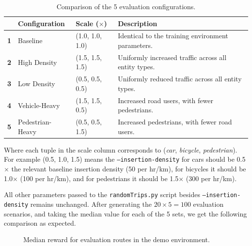 \documentclass[a4paper]{report}
\begin{document}
\begin{table}[H]
  \centering
  \begin{tabular}{c l l l}
    \hline
    & \textbf{Configuration} & \textbf{Scale ($\times$)} & \textbf{Description} \\
    \hline
    \textbf{1} & Baseline & (1.0, 1.0, 1.0) & Identical to the training environment parameters. \\
    \textbf{2} & High Density & (1.5, 1.5, 1.5) & Uniformly increased traffic across all entity types. \\
    \textbf{3} & Low Density & (0.5, 0.5, 0.5) & Uniformly reduced traffic across all entity types. \\
    \textbf{4} & Vehicle-Heavy & (1.5, 1.5, 0.5) & Increased road users, with fewer pedestrians. \\
    \textbf{5} & Pedestrian-Heavy & (0.5, 0.5, 1.5) & Increased pedestrians, with fewer road users. \\
    \hline
  \end{tabular}
  \caption{Comparison of the 5 evaluation configurations.}
  \label{tab:evaluation_configs}
\end{table}

Where each tuple in the scale column corresponds to (\emph{car}, \emph{bicycle}, \emph{pedestrian}). For example (0.5, 1.0, 1.5) means the \texttt{--insertion-density} for cars should be 0.5$\times$ the relevant baseline insertion density (50 per hr/km), for bicycles it should be 1.0$\times$ (100 per hr/km), and for pedestrians it should be 1.5$\times$ (300 per hr/km).

All other parameters passed to the \texttt{randomTrips.py} script besides \texttt{--insertion-density} remains unchanged. After generating the $20\times5=100$ evaluation scenarios, and taking the median value for each of the 5 sets, we get the following comparison as expected.

\begin{figure}[H]
  \centering
  \caption{Median reward for evaluation routes in the demo environment.}
  \label{fig:q_learning_demo_eval}
\end{figure}
\end{document}
